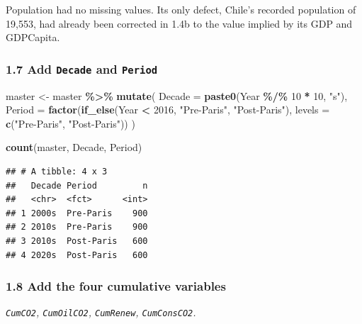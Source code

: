 \documentclass[
]{article}
\newenvironment{Shaded}{\begin{snugshade}}{\end{snugshade}}
\newcommand{\AttributeTok}[1]{\textcolor[rgb]{0.13,0.29,0.53}{#1}}
\newcommand{\DecValTok}[1]{\textcolor[rgb]{0.00,0.00,0.81}{#1}}
\newcommand{\FunctionTok}[1]{\textcolor[rgb]{0.13,0.29,0.53}{\textbf{#1}}}
\newcommand{\NormalTok}[1]{#1}
\newcommand{\OtherTok}[1]{\textcolor[rgb]{0.56,0.35,0.01}{#1}}
\newcommand{\SpecialCharTok}[1]{\textcolor[rgb]{0.81,0.36,0.00}{\textbf{#1}}}
\newcommand{\StringTok}[1]{\textcolor[rgb]{0.31,0.60,0.02}{#1}}
\begin{document}
Population had no missing values. Its only defect, Chile's recorded
population of 19,553, had already been corrected in 1.4b to the value
implied by its GDP and GDPCapita.

\subsubsection{\texorpdfstring{1.7 Add \texttt{Decade} and
\texttt{Period}}{1.7 Add Decade and Period}}\label{add-decade-and-period}

\begin{Shaded}
\begin{Highlighting}[]
\NormalTok{master }\OtherTok{\textless{}{-}}\NormalTok{ master }\SpecialCharTok{\%\textgreater{}\%}
  \FunctionTok{mutate}\NormalTok{(}
    \AttributeTok{Decade =} \FunctionTok{paste0}\NormalTok{(Year }\SpecialCharTok{\%/\%} \DecValTok{10} \SpecialCharTok{*} \DecValTok{10}\NormalTok{, }\StringTok{"s"}\NormalTok{),}
    \AttributeTok{Period =} \FunctionTok{factor}\NormalTok{(}\FunctionTok{if\_else}\NormalTok{(Year }\SpecialCharTok{\textless{}} \DecValTok{2016}\NormalTok{, }\StringTok{"Pre{-}Paris"}\NormalTok{, }\StringTok{"Post{-}Paris"}\NormalTok{),}
                    \AttributeTok{levels =} \FunctionTok{c}\NormalTok{(}\StringTok{"Pre{-}Paris"}\NormalTok{, }\StringTok{"Post{-}Paris"}\NormalTok{))}
\NormalTok{  )}

\FunctionTok{count}\NormalTok{(master, Decade, Period)}
\end{Highlighting}
\end{Shaded}

\begin{verbatim}
## # A tibble: 4 x 3
##   Decade Period         n
##   <chr>  <fct>      <int>
## 1 2000s  Pre-Paris    900
## 2 2010s  Pre-Paris    900
## 3 2010s  Post-Paris   600
## 4 2020s  Post-Paris   600
\end{verbatim}

\subsubsection{1.8 Add the four cumulative
variables}\label{add-the-four-cumulative-variables}

\emph{\texttt{CumCO2}, \texttt{CumOilCO2}, \texttt{CumRenew},
\texttt{CumConsCO2}.}
\end{document}
